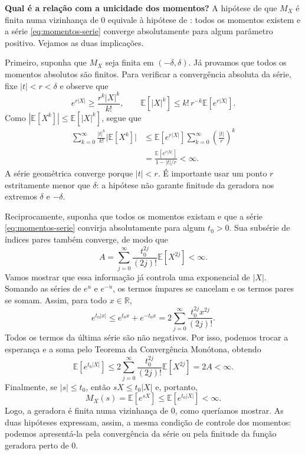 \documentclass[12pt,portuguese]{article}
\theoremstyle{definition}
\theoremstyle{plainexercise}
\theoremstyle{starredexercise}
\theoremstyle{definition}
\begin{document}
\medskip
\noindent\textbf{Qual é a relação com a unicidade dos momentos?}
A hipótese de que $M_X$ é finita numa vizinhança de $0$ equivale à
hipótese de : todos os momentos existem e a
série \eqref{eq:momentos-serie} converge absolutamente para algum parâmetro
positivo. Vejamos as duas implicações.

\bigskip 

Primeiro, suponha que $M_X$ seja finita em $(-\delta,\delta)$.
Já provamos que todos os momentos absolutos são finitos. Para verificar
a convergência absoluta da série, fixe $|t|<r<\delta$ e observe que
\[
e^{r|X|}\geqslant\frac{r^k|X|^k}{k!},
\qquad
\mathbb{E}[|X|^k]\leqslant k!\,r^{-k}\mathbb{E}[e^{r|X|}].
\]
Como $|\mathbb{E}[X^k]|\leqslant\mathbb{E}[|X|^k]$, segue que
\begin{align*}
\sum_{k=0}^{\infty}\frac{|t|^k}{k!}\bigl|\mathbb{E}[X^k]\bigr|
&\leqslant\mathbb{E}[e^{r|X|}]
  \sum_{k=0}^{\infty}\left(\frac{|t|}{r}\right)^k
\\[0.3cm]
&=\frac{\mathbb{E}[e^{r|X|}]}{1-|t|/r}<\infty.
\end{align*}
A série geométrica converge porque $|t|<r$. É importante usar um ponto
$r$ estritamente menor que $\delta$: a hipótese não garante finitude da
geradora nos extremos $\delta$ e $-\delta$.


\bigskip 

Reciprocamente, suponha que todos os momentos existam e que a série
\eqref{eq:momentos-serie} convirja absolutamente para algum $t_0>0$.
Sua subsérie de índices pares também converge, de modo que
\[
A=\sum_{j=0}^{\infty}\frac{t_0^{2j}}{(2j)!}\mathbb{E}[X^{2j}]<\infty.
\]
Vamos mostrar que essa informação já controla uma exponencial de $|X|$.
Somando as séries de $e^u$ e $e^{-u}$, os termos ímpares se cancelam e
os termos pares se somam. Assim, para todo $x\in\mathbb{R}$,
\[
e^{t_0|x|}\leqslant e^{t_0x}+e^{-t_0x}
=2\sum_{j=0}^{\infty}\frac{t_0^{2j}x^{2j}}{(2j)!}.
\]
Todos os termos da última série são não negativos. Por isso, podemos
trocar a esperança e a soma pelo Teorema da Convergência Monótona,
obtendo
\[
\mathbb{E}[e^{t_0|X|}]
\leqslant 2\sum_{j=0}^{\infty}\frac{t_0^{2j}}{(2j)!}\mathbb{E}[X^{2j}]
=2A<\infty.
\]
Finalmente, se $|s|\leqslant t_0$, então $sX\leqslant t_0|X|$ e, portanto,
\[
M_X(s)=\mathbb{E}[e^{sX}]
\leqslant\mathbb{E}[e^{t_0|X|}]<\infty.
\]
Logo, a geradora é finita numa vizinhança de $0$, como queríamos mostrar.
As duas hipóteses expressam, assim, a mesma condição de controle dos
momentos: podemos apresentá-la pela convergência da série ou pela
finitude da função geradora perto de $0$.
\end{document}
